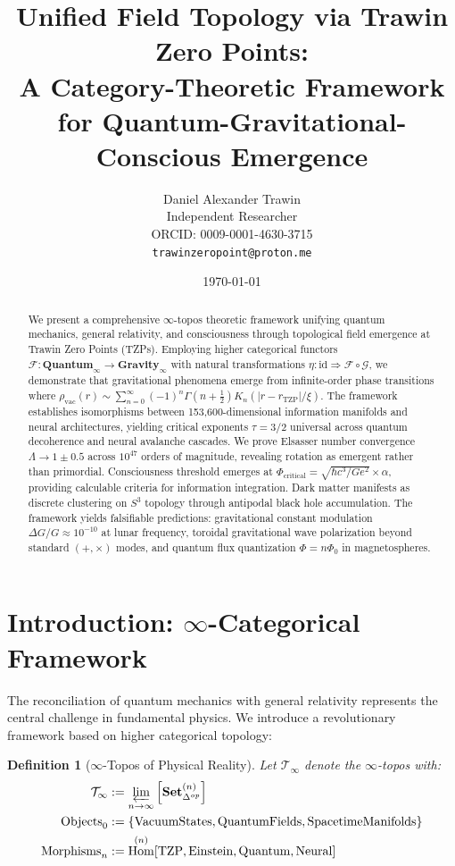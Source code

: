 \documentclass[11pt,a4paper]{article}
\title{Unified Field Topology via Trawin Zero Points:\\
A Category-Theoretic Framework for Quantum-Gravitational-Conscious Emergence}
\author{Daniel Alexander Trawin\\
Independent Researcher\\
ORCID: 0009-0001-4630-3715\\
\texttt{trawinzeropoint@proton.me}}
\date{\today}
\newtheorem{definition}[theorem]{Definition}
\DeclareMathOperator{\Hom}{Hom}
\DeclareMathOperator{\TZP}{TZP}
\begin{document}
\maketitle


\begin{abstract}
We present a comprehensive $\infty$-topos theoretic framework unifying quantum mechanics, general relativity, and consciousness through topological field emergence at Trawin Zero Points (TZPs). Employing higher categorical functors $\mathcal{F}: \mathbf{Quantum}_\infty \to \mathbf{Gravity}_\infty$ with natural transformations $\eta: \text{id} \Rightarrow \mathcal{F} \circ \mathcal{G}$, we demonstrate that gravitational phenomena emerge from infinite-order phase transitions where $\rho_{\text{vac}}(r) \sim \sum_{n=0}^{\infty} (-1)^n \Gamma(n+\tfrac{1}{2}) K_n(|r-r_{\TZP}|/\xi)$. The framework establishes isomorphisms between 153,600-dimensional information manifolds and neural architectures, yielding critical exponents $\tau = 3/2$ universal across quantum decoherence and neural avalanche cascades. We prove Elsasser number convergence $\Lambda \to 1 \pm 0.5$ across $10^{47}$ orders of magnitude, revealing rotation as emergent rather than primordial. Consciousness threshold emerges at $\Phi_{\text{critical}} = \sqrt{\hbar c^3/Ge^2} \times \alpha$, providing calculable criteria for information integration. Dark matter manifests as discrete clustering on $S^3$ topology through antipodal black hole accumulation. The framework yields falsifiable predictions: gravitational constant modulation $\Delta G/G \approx 10^{-10}$ at lunar frequency, toroidal gravitational wave polarization beyond standard $(+,\times)$ modes, and quantum flux quantization $\Phi = n\Phi_0$ in magnetospheres.
\end{abstract}


\section{Introduction: $\infty$-Categorical Framework}


The reconciliation of quantum mechanics with general relativity represents the central challenge in fundamental physics. We introduce a revolutionary framework based on higher categorical topology:


\begin{definition}[$\infty$-Topos of Physical Reality]
Let $\mathcal{T}_\infty$ denote the $\infty$-topos with:
\begin{align}
\mathcal{T}_\infty &:= \varprojlim_{n \to \infty} \left[ \mathbf{Set}_{\Delta^{op}}^{(n)} \right] \\
\text{Objects}_0 &:= \{\text{VacuumStates}, \text{QuantumFields}, \text{SpacetimeManifolds}\} \\
\text{Morphisms}_n &:= \Hom^{(n)}[\TZP, \text{Einstein}, \text{Quantum}, \text{Neural}]
\end{align}
\end{definition}
\end{document}
